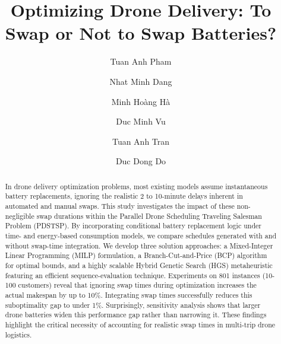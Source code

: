 \documentclass[3p, authoryear, 11pt]{elsarticle}
\title{Optimizing Drone Delivery: To Swap or Not to Swap Batteries?}
\author[add3,add4]{Tuan Anh Pham}
\author[add3]{Nhat Minh Dang}
\author[add2]{Minh Ho{\`a}ng H{\`a}\corref{cor1}}
\author[add3]{Duc Minh Vu}
\author[add3]{Tuan Anh Tran}
\author[add4]{Duc Dong Do}
\begin{document}
 \begin{abstract}

In drone delivery optimization problems, most existing models assume instantaneous battery replacements, ignoring the realistic 2 to 10-minute delays inherent in automated and manual swaps. This study investigates the impact of these non-negligible swap durations within the Parallel Drone Scheduling Traveling Salesman Problem (PDSTSP). By incorporating conditional battery replacement logic under time- and energy-based consumption models, we compare schedules generated with and without swap-time integration. We develop three solution approaches: a Mixed-Integer Linear Programming (MILP) formulation, a Branch-Cut-and-Price (BCP) algorithm for optimal bounds, and a highly scalable Hybrid Genetic Search (HGS) metaheuristic featuring an efficient sequence-evaluation technique. Experiments on 801 instances (10-100 customers) reveal that ignoring swap times during optimization increases the actual makespan by up to 10\%. Integrating swap times successfully reduces this suboptimality gap to under 1\%. Surprisingly, sensitivity analysis shows that larger drone batteries widen this performance gap rather than narrowing it. These findings highlight the critical necessity of accounting for realistic swap times in multi-trip drone logistics.

 \end{abstract}
\end{document}
